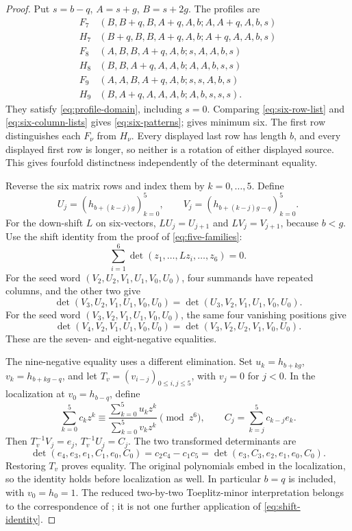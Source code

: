 \documentclass[11pt,a4paper]{amsart}
\numberwithin{equation}{section}
\theoremstyle{plain}
\theoremstyle{definition}
\begin{document}
\begin{proof}
Put \(s=b-q\), \(A=s+g\), \(B=s+2g\).  The profiles are
\begin{equation}\label{eq:six-profiles}
 \begin{array}{c|l}
 F_7&(B,B+q,B,A+q,A,b;A,A+q,A,b,s)\\
 H_7&(B+q,B,B,A+q,A,b;A+q,A,A,b,s)\\
 F_8&(A,B,B,A+q,A,b;s,A,A,b,s)\\
 H_8&(B,B,A+q,A,A,b;A,A,b,s,s)\\
 F_9&(A,A,B,A+q,A,b;s,s,A,b,s)\\
 H_9&(B,A+q,A,A,A,b;A,b,s,s,s).
 \end{array}
\end{equation}
They satisfy \eqref{eq:profile-domain}, including \(s=0\).  Comparing \eqref{eq:six-row-list} and \eqref{eq:six-column-lists} gives \eqref{eq:six-patterns};  gives minimum six.  The first row distinguishes each \(F_\nu\) from \(H_\nu\).  Every displayed last row has length \(b\), and every displayed first row is longer, so neither is a rotation of either displayed source.  This gives fourfold distinctness independently of the determinant equality.

Reverse the six matrix rows and index them by \(k=0,\ldots,5\).  Define
\[
 U_j=(h_{b+(k-j)g})_{k=0}^5,\qquad
 V_j=(h_{b+(k-j)g-q})_{k=0}^5.
\]
For the down-shift \(L\) on six-vectors, \(LU_j=U_{j+1}\) and \(LV_j=V_{j+1}\), because \(b<g\).  Use the shift identity from the proof of \eqref{eq:five-families}:
\begin{equation}\label{eq:shift-identity}
 \sum_{i=1}^{6}\det(z_1,\ldots,Lz_i,\ldots,z_6)=0.
\end{equation}
For the seed word \((V_2,U_2,V_1,U_1,V_0,U_0)\), four summands have repeated columns, and the other two give
\[
 \det(V_3,U_2,V_1,U_1,V_0,U_0)
 =\det(U_3,V_2,V_1,U_1,V_0,U_0).
\]
For the seed word \((V_3,V_2,V_1,U_1,V_0,U_0)\), the same four vanishing positions give
\[
 \det(V_4,V_2,V_1,U_1,V_0,U_0)
 =\det(V_3,V_2,U_2,V_1,V_0,U_0).
\]
These are the seven- and eight-negative equalities.

The nine-negative equality uses a different elimination.  Set
\(u_k=h_{b+kg}\), \(v_k=h_{b+kg-q}\), and let \(T_v=(v_{i-j})_{0\le i,j\le5}\), with \(v_j=0\) for \(j<0\).  In the localization at \(v_0=h_{b-q}\), define
\[
 \sum_{k=0}^{5}c_kz^k\equiv
 \frac{\sum_{k=0}^{5}u_kz^k}{\sum_{k=0}^{5}v_kz^k}\pmod{z^6},
 \qquad C_j=\sum_{k=j}^{5}c_{k-j}e_k.
\]
Then \(T_v^{-1}V_j=e_j\), \(T_v^{-1}U_j=C_j\).  The two transformed determinants are
\begin{equation}\label{eq:nine-minor}
 \det(e_4,e_3,e_1,C_1,e_0,C_0)
 =c_2c_4-c_1c_5
 =\det(e_3,C_3,e_2,e_1,e_0,C_0).
\end{equation}
Restoring \(T_v\) proves equality.  The original polynomials embed in the localization, so the identity holds before localization as well.  In particular \(b=q\) is included, with \(v_0=h_0=1\).  The reduced two-by-two Toeplitz-minor interpretation belongs to the correspondence of \cite{GarciaGarcia2020ToeplitzMinors}; it is not one further application of \eqref{eq:shift-identity}.
\end{proof}
\end{document}

